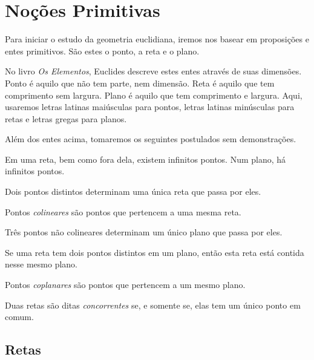 \chapter{Noções Primitivas}
Para iniciar o estudo da geometria euclidiana, iremos nos basear em proposições e entes primitivos. São estes o ponto, a reta e o plano. \par %
No livro \textit{Os Elementos}, Euclides descreve estes entes através de suas dimensões. Ponto é aquilo que não tem parte, nem dimensão. Reta é aquilo que tem comprimento sem largura. Plano é aquilo que tem comprimento e largura. %
Aqui, usaremos letras latinas maiúsculas para pontos, letras latinas minúsculas para retas e letras gregas para planos. \par 
Além dos entes acima, tomaremos os seguintes postulados sem demonstrações.

\begin{post}
Em uma reta, bem como fora dela, existem infinitos pontos.
Num plano, há infinitos pontos.
\end{post}
\begin{post}
Dois pontos distintos determinam uma única reta que passa por eles.
\end{post}
\begin{df}
Pontos \emph{colineares} são pontos que pertencem a uma mesma reta.
\end{df}
\begin{post}
Três pontos não colineares determinam um único plano que passa por eles.
\end{post}
\begin{post}
Se uma reta tem dois pontos distintos em um plano, então esta reta está contida nesse mesmo plano.
\end{post}
\begin{df}
Pontos \emph{coplanares} são pontos que pertencem a um mesmo plano.
\end{df}
\begin{df}
Duas retas são ditas \emph{concorrentes} se, e somente se, elas tem um único ponto em comum.
\end{df}

\section{Retas}
\blindtext %
